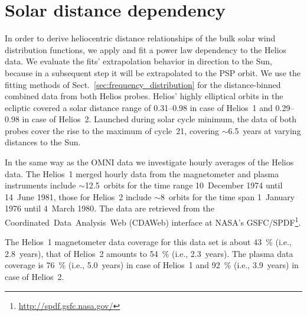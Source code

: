 \section{Solar distance dependency}
\label{sec:solar_distance_dependency}
In order to derive heliocentric distance relationships of the bulk solar wind distribution functions, we apply and fit a power law dependency to the Helios data. We evaluate the fits’ extrapolation behavior in direction to the Sun, because in a subsequent step it will be extrapolated to the PSP orbit. We use the fitting methods of Sect.~\ref{sec:frequency_distribution} for the distance-binned combined data from both Helios probes. Helios’ highly elliptical orbits in the ecliptic covered a solar distance range of \SIrange{0.31}{0.98}{\au} in case of Helios~1 and \SIrange{0.29}{0.98}{\au} in case of Helios~2. Launched during solar cycle minimum, the data of both probes cover the rise to the maximum of cycle~21, covering $\sim$6.5~years at varying distances to the Sun.

In the same way as the OMNI data we investigate hourly averages of the Helios data. The Helios~1 merged hourly data from the magnetometer and plasma instruments \citep{Rosenbauer1977} include $\sim$12.5~orbits for the time range 10~December 1974 until 14~June 1981, those for Helios~2 include $\sim$8~orbits for the time span 1~January 1976 until 4~March 1980. The data are retrieved from the Coordinated~Data~Analysis~Web (CDAWeb) interface at NASA's GSFC/SPDF\footnote{\url{http://spdf.gsfc.nasa.gov/}}.

The Helios~1 magnetometer data coverage for this data set is about \SI{43}{\%} (i.e., 2.8~years), that of Helios~2 amounts to \SI{54}{\%} (i.e., 2.3~years). The plasma data coverage is \SI{76}{\%} (i.e., 5.0~years) in case of Helios~1 and \SI{92}{\%} (i.e., 3.9~years) in case of Helios~2. 

